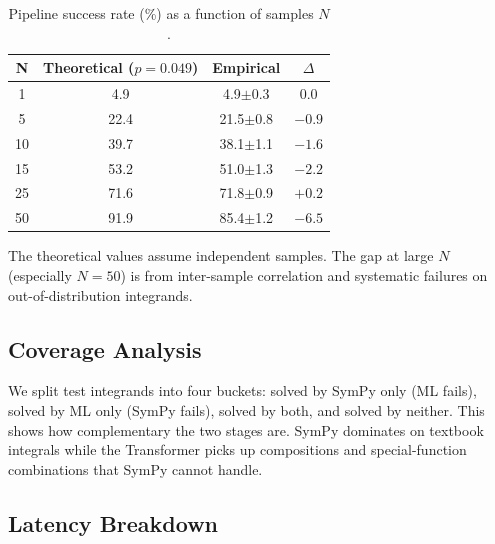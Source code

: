 \documentclass[conference]{IEEEtran}
\begin{document}
\begin{table}[htbp]
\caption{Pipeline success rate (\%) as a function of samples $N$.}
\begin{center}
\begin{tabular}{|c|c|c|c|}
\hline
\textbf{N} & \textbf{Theoretical ($p = 0.049$)} & \textbf{Empirical} & \textbf{$\Delta$} \\
\hline
1 & 4.9 & 4.9\footnotesize{$\pm$0.3} & 0.0 \\
\hline
5 & 22.4 & 21.5\footnotesize{$\pm$0.8} & $-0.9$ \\
\hline
10 & 39.7 & 38.1\footnotesize{$\pm$1.1} & $-1.6$ \\
\hline
15 & 53.2 & 51.0\footnotesize{$\pm$1.3} & $-2.2$ \\
\hline
25 & 71.6 & 71.8\footnotesize{$\pm$0.9} & $+0.2$ \\
\hline
50 & 91.9 & 85.4\footnotesize{$\pm$1.2} & $-6.5$ \\
\hline
\end{tabular}
\label{tab:sampling}
\end{center}
\end{table}

The theoretical values assume independent samples. The gap at large $N$ (especially $N = 50$) is from inter-sample correlation and systematic failures on out-of-distribution integrands.

\subsection{Coverage Analysis}

We split test integrands into four buckets: solved by SymPy only (ML fails), solved by ML only (SymPy fails), solved by both, and solved by neither. This shows how complementary the two stages are. SymPy dominates on textbook integrals while the Transformer picks up compositions and special-function combinations that SymPy cannot handle.

\subsection{Latency Breakdown}
\end{document}
